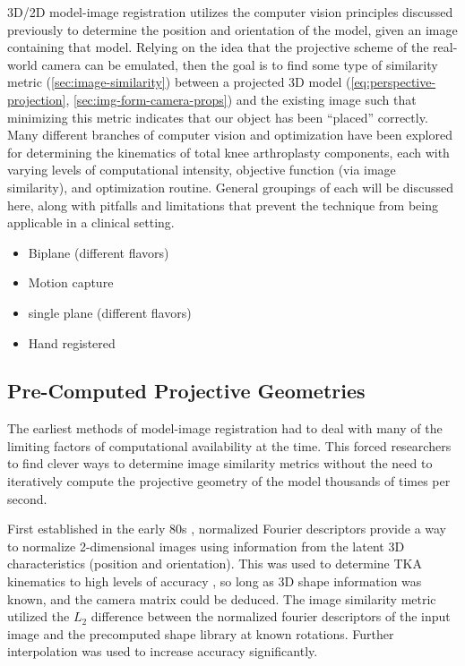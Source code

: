 3D/2D model-image registration utilizes the computer vision principles discussed previously to determine the position and orientation of the model, given an image containing that model. Relying on the idea that the projective scheme of the real-world camera can be emulated, then the goal is to find some type of similarity metric (\cref{sec:image-similarity}) between a projected 3D model (\cref{eq:perspective-projection}, \cref{sec:img-form-camera-props}) and the existing image such that minimizing this metric indicates that our object has been ``placed'' correctly. Many different branches of computer vision and optimization have been explored for determining the kinematics of total knee arthroplasty components, each with varying levels of computational intensity, objective function (via image similarity), and optimization routine. General groupings of each will be discussed here, along with pitfalls and limitations that prevent the technique from being applicable in a clinical setting.

\begin{center}
    \begin{Large}
        \begin{itemize}
            \item Biplane (different flavors)
            \item Motion capture
            \item single plane (different flavors)
            \item Hand registered
        \end{itemize}
    \end{Large}
\end{center}

\subsection{Pre-Computed Projective Geometries}
The earliest methods of model-image registration had to deal with many of the limiting factors of computational availability at the time. This forced researchers to find clever ways to determine image similarity metrics without the need to iteratively compute the projective geometry of the model thousands of times per second.

First established in the early 80s \cite{wallaceAnalysisThreedimensionalMovement1980,wallaceEfficientThreedimensionalAircraft1980}, normalized Fourier descriptors provide a way to normalize 2-dimensional images using information from the latent 3D characteristics (position and orientation). This was used to determine TKA kinematics to high levels of accuracy \cite{banksModelBased3D1992,banksAccurateMeasurementThreedimensional1996}, so long as 3D shape information was known, and the camera matrix could be deduced. The image similarity metric utilized the $L_2$ difference between the normalized fourier descriptors of the input image and the precomputed shape library at known rotations. Further interpolation was used to increase accuracy significantly.

